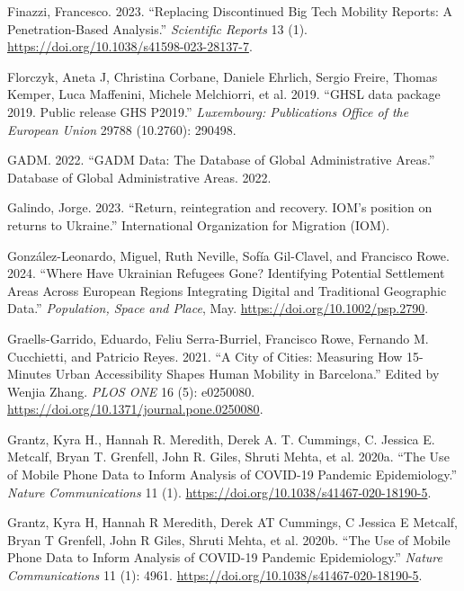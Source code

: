 \documentclass[
  sn-nature,
  11pt,
]{sn-jnl}
\newlength{\cslhangindent}
\newenvironment{CSLReferences}[2] %
 {\begin{list}{}{%
  \setlength{\itemindent}{0pt}
  \setlength{\leftmargin}{0pt}
  \setlength{\parsep}{0pt}
  \ifodd #1
   \setlength{\leftmargin}{\cslhangindent}
   \setlength{\itemindent}{-1\cslhangindent}
  \fi
  \setlength{\itemsep}{#2\baselineskip}}}
 {\end{list}}
\begin{document}
\begin{CSLReferences}{1}{0}
Finazzi, Francesco. 2023. {``Replacing Discontinued Big Tech Mobility
Reports: A Penetration-Based Analysis.''} \emph{Scientific Reports} 13
(1). \url{https://doi.org/10.1038/s41598-023-28137-7}.

Florczyk, Aneta J, Christina Corbane, Daniele Ehrlich, Sergio Freire,
Thomas Kemper, Luca Maffenini, Michele Melchiorri, et al. 2019. {``{GHSL
data package 2019. Public release GHS P2019}.''} \emph{{Luxembourg:
Publications Office of the European Union}} 29788 (10.2760): 290498.

GADM. 2022. {``{GADM} Data: The Database of Global Administrative
Areas.''} Database of Global Administrative Areas. 2022.

Galindo, Jorge. 2023. {``{Return, reintegration and recovery. IOM's
position on returns to Ukraine}.''} {International Organization for
Migration (IOM)}.

González-Leonardo, Miguel, Ruth Neville, Sofía Gil-Clavel, and Francisco
Rowe. 2024. {``Where Have Ukrainian Refugees Gone? Identifying Potential
Settlement Areas Across European Regions Integrating Digital and
Traditional Geographic Data.''} \emph{Population, Space and Place}, May.
\url{https://doi.org/10.1002/psp.2790}.

Graells-Garrido, Eduardo, Feliu Serra-Burriel, Francisco Rowe, Fernando
M. Cucchietti, and Patricio Reyes. 2021. {``A City of Cities: Measuring
How 15-Minutes Urban Accessibility Shapes Human Mobility in
Barcelona.''} Edited by Wenjia Zhang. \emph{PLOS ONE} 16 (5): e0250080.
\url{https://doi.org/10.1371/journal.pone.0250080}.

Grantz, Kyra H., Hannah R. Meredith, Derek A. T. Cummings, C. Jessica E.
Metcalf, Bryan T. Grenfell, John R. Giles, Shruti Mehta, et al. 2020a.
{``The Use of Mobile Phone Data to Inform Analysis of COVID-19 Pandemic
Epidemiology.''} \emph{Nature Communications} 11 (1).
\url{https://doi.org/10.1038/s41467-020-18190-5}.

Grantz, Kyra H, Hannah R Meredith, Derek AT Cummings, C Jessica E
Metcalf, Bryan T Grenfell, John R Giles, Shruti Mehta, et al. 2020b.
{``The Use of Mobile Phone Data to Inform Analysis of {COVID-19}
Pandemic Epidemiology.''} \emph{Nature Communications} 11 (1): 4961.
\url{https://doi.org/10.1038/s41467-020-18190-5}.


\end{CSLReferences}
\end{document}
